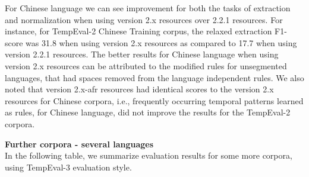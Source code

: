 For Chinese language we can see improvement for both the tasks of extraction and normalization when using version 2.x resources over 2.2.1 resources. For instance, for TempEval-2 Chinese Training corpus, the relaxed extraction F1-score was 31.8 when using version 2.x resources as compared to 17.7 when using version 2.2.1 resources. The better results for Chinese language when using version 2.x resources can be attributed to the modified rules for unsegmented languages, that had spaces removed from the language independent rules. We also noted that version 2.x-afr resources had identical scores to the version 2.x resources for Chinese corpora, i.e., frequently occurring temporal patterns learned as rules, for Chinese language, did not improve the results for the TempEval-2 corpora.

\textbf{Further corpora - several languages}\\
In the following table, we summarize evaluation results for some more corpora, using TempEval-3 evaluation style. 

